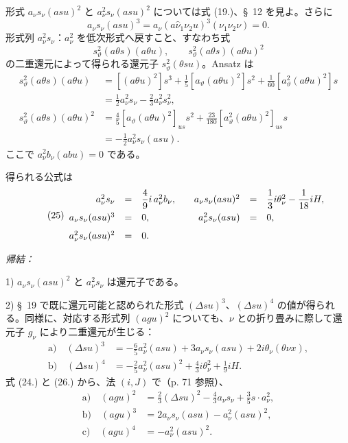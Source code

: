 \documentclass[11pt]{article}
\newcommand{\A}{\Delta}
\begin{document}
形式 $a_\nu s_\nu(asu)^2$ と $a_\nu^2s_\nu(asu)^2$ については式 (19.)、\S\ 12 を見よ。さらに
\[
 a_\nu s_\nu(asu)^3=a_\nu(a\widehat{\nu}_1\nu_2u)^3(\nu_1\nu_2\nu)=0.
\]
形式列 $a_\nu^2s_\nu$：$a_\nu^2$ を低次形式へ戻すこと、すなわち式
\[
 s_\vartheta^2(a\theta s)(a\theta u),
 \qquad s_\vartheta^2(a\theta s)(a\theta u)^2
\]
の二重還元によって得られる還元子 $s_\vartheta^2(\theta su)$。Ansatz は
\[
\begin{aligned}
s_\vartheta^2(a\theta s)(a\theta u)
&=[(a\theta u)^2]s^3+\frac15[a_\vartheta(a\theta u)^2]s^2+\frac1{60}[a_\vartheta^2(a\theta u)^2]s\\
&=\frac12a_\nu^2s_\nu-\frac23a_\nu^2s_\nu^2,\\
s_\vartheta^2(a\theta s)(a\theta u)^2
&=\frac45[a_\vartheta(a\theta u)^2]_{us}s^2+\frac{23}{180}[a_\vartheta^2(a\theta u)^2]_{us}s\\
&=-\frac12a_\nu^2s_\nu(asu).
\end{aligned}
\]
ここで $a_\nu^2b_\nu(abu)=0$ である。

得られる公式は
\[
\tag{25}
\begin{array}{rcl@{\qquad}rcl}
a_\nu^2s_\nu&=&\dfrac49i\,a_\nu^2b_\nu,
& a_\nu s_\nu(asu)^2&=&\dfrac13i\theta_\nu^2-\dfrac1{18}iH,\\[0.7em]
a_\nu s_\nu(asu)^3&=&0,
& a_\nu^2s_\nu(asu)&=&0,\\[0.7em]
a_\nu^2s_\nu(asu)^2&=&0.
\end{array}
\]

\noindent\emph{帰結：}

1) $a_\nu s_\nu(asu)^2$ と $a_\nu^2s_\nu$ は還元子である。

2) \S\ 19 で既に還元可能と認められた形式 $(\A su)^3$、$(\A su)^4$ の値が得られる。同様に、対応する形式列 $(agu)^2$ についても、$\nu$ との折り畳みに際して還元子 $g_\nu$ により二重還元が生じる：
\[
\tag{26}
\begin{aligned}
\text{a)}\quad (\A su)^3&=-\frac65a_\nu^2(asu)+3a_\nu s_\nu(asu)+2i\theta_\nu(\theta\nu x),\\
\text{b)}\quad (\A su)^4&=-\frac25a_\nu^2(asu)^2+\frac43i\theta_\nu^2+\frac19iH.
\end{aligned}
\]
式 (24.) と (26.) から、法 $(i,J)$ で（p. 71 参照）、
\[
\tag{27}
\begin{aligned}
\text{a)}\quad (agu)^2&=\frac23(\A su)^2-\frac43a_\nu s_\nu+\frac35s\cdot a_\nu^2,\\
\text{b)}\quad (agu)^3&=2a_\nu s_\nu(asu)-a_\nu^2(asu)^2,\\
\text{c)}\quad (agu)^4&=-a_\nu^2(asu)^2.
\end{aligned}
\]
\end{document}

